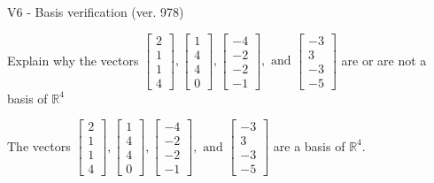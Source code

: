 \begin{exercise}
  \begin{exerciseTitle}V6 - Basis verification (ver. 978)\end{exerciseTitle}
  \begin{exerciseStatement}
    Explain why the vectors \(\left[\begin{array}{r}
2 \\
1 \\
1 \\
4
\end{array}\right] , \left[\begin{array}{r}
1 \\
4 \\
4 \\
0
\end{array}\right] , \left[\begin{array}{r}
-4 \\
-2 \\
-2 \\
-1
\end{array}\right] , \text{ and } \left[\begin{array}{r}
-3 \\
3 \\
-3 \\
-5
\end{array}\right]\) are or are not a basis of \(\mathbb{R}^4\)	


  \end{exerciseStatement}
  \begin{exerciseAnswer}
   The vectors \(\left[\begin{array}{r}
2 \\
1 \\
1 \\
4
\end{array}\right] , \left[\begin{array}{r}
1 \\
4 \\
4 \\
0
\end{array}\right] , \left[\begin{array}{r}
-4 \\
-2 \\
-2 \\
-1
\end{array}\right] , \text{ and } \left[\begin{array}{r}
-3 \\
3 \\
-3 \\
-5
\end{array}\right]\) 
  	 are  a basis of \(\mathbb{R}^4\).
  


  \end{exerciseAnswer}
\end{exercise}